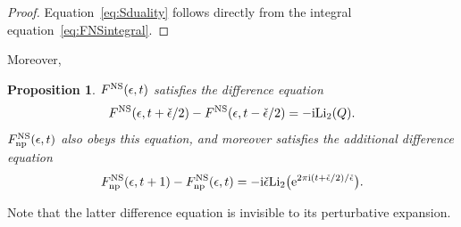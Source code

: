 \documentclass[pdftex]{sigma}
\numberwithin{equation}{section}
\newtheorem{Proposition}[Theorem]{Proposition}
 { \theoremstyle{definition}
\newtheorem{Definition}[Theorem]{Definition}
\newtheorem{Note}[Theorem]{Note}
\newtheorem{Example}[Theorem]{Example}
\newtheorem{Remark}[Theorem]{Remark} }
\begin{document}
\begin{proof}
Equation~\eqref{eq:Sduality} follows directly from the integral equation~\eqref{eq:FNSintegral}.
\end{proof}

Moreover,
\begin{Proposition}
$F^{\rm NS}(\epsilon,t)$ satisfies the difference equation
\begin{equation}\label{eq:NSdiffeq}
 F^{\rm NS}(\epsilon,t+\check{\epsilon}/2)-F^{\rm NS}(\epsilon,t-\check\epsilon/2)= -\mathrm{i} {\rm Li}_2(Q).
\end{equation}
$F^{\rm NS}_{{\rm np}}(\epsilon,t)$ also obeys this equation, and moreover satisfies the additional difference equation
\begin{equation}\label{tdiffeqNS}
 F^{\rm NS}_{{\rm np}}(\epsilon,t+1)-F^{\rm NS}_{{\rm np}}(\epsilon,t)=-\mathrm{i}\check\epsilon \mathrm{Li}_2\big({\rm e}^{2\pi \mathrm{i}(t+\check\epsilon/2)/\check\epsilon}\big).
\end{equation}
\end{Proposition}

Note that the latter difference equation is invisible to its perturbative expansion.
\end{document}
